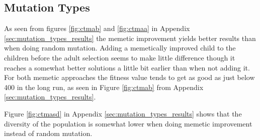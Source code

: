 
\subsection{Mutation Types} %
\label{sub:mutation_types}

As seen from figures \ref{fig:ctmab} and \ref{fig:ctmaa} in Appendix \ref{sec:mutation_types_results} the memetic improvement yields better results than when doing random mutation. Adding a memetically improved child to the children before the adult selection seems to make little difference though it reaches a somewhat better solutions a little bit earlier than when not adding it. For both memetic approaches the fitness value tends to get as good as just below 400 in the long run, as seen in Figure \ref{fig:ctmab} from Appendix \ref{sec:mutation_types_results}.

Figure \ref{fig:ctmasd} in Appendix \ref{sec:mutation_types_results} shows that the diversity of the population is somewhat lower when doing memetic improvement instead of random mutation.





